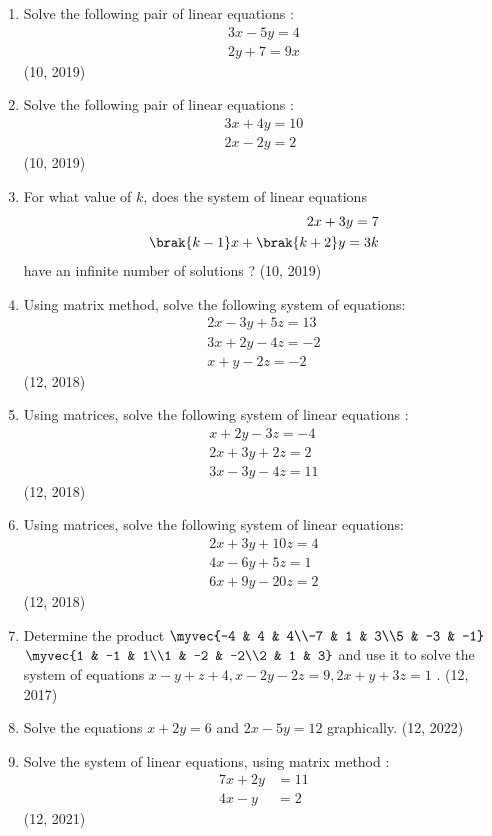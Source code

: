 \begin{enumerate}[label=\thesubsection.\arabic*,ref=\thesubsection.\theenumi]
\item Solve the following pair of linear equations :
\begin{align*}
 3x - 5y = 4\\
2y + 7 = 9x   
\end{align*}    
\hfill (10, 2019)

\item Solve the following pair of linear equations :
\begin{align*}
 3x + 4y = 10\\
2x - 2y = 2   
\end{align*}    
\hfill (10, 2019)
\item For what value of $k$, does the system of linear equations
\begin{align*}
   2x + 3y = 7\\
 \brak{k - 1} x + \brak{k + 2} y = 3k
\end{align*}
have an infinite number of solutions ?
\hfill (10, 2019)
\item Using matrix method, solve the following system of equations: \begin{align*}
  2{x}-3{y}+5{z}=13 \\  3{x}+2{y}-4{z}=-2 \\
  {x}+{y}-2{z}=-2
 \end{align*}
\hfill (12, 2018)
\item Using matrices, solve the following system of linear equations :
	\begin{align*}
		x+2y-3z=-4\\
		2x+3y+2z=2\\
		3x-3y-4z=11
	\end{align*}
\hfill (12, 2018)
\item Using matrices, solve the following system of linear equations:
 \begin{align*}
  2x+3y+10z=4\\
  4x-6y+5z=1\\
  6x+9y-20z=2
 \end{align*}
\hfill (12, 2018)
\item Determine the product	$\myvec{-4 & 4 & 4\\-7 & 1 & 3\\5 & -3 & -1}$ $\myvec{1 & -1 &  1\\1 & -2 & -2\\2 &  1 &  3}$ and use it to solve the system of equations $x-y+z+4, x-2y-2z=9, 2x+y+3z=1$ .
\hfill (12, 2017)
\item Solve the equations $x+2y=6$ and $2x-5y=12$ graphically. \hfill (12, 2022)
\item Solve the system of linear equations, using matrix method : 
\begin{align*}
  7x + 2y &= 11\\
  4x - y &= 2
\end{align*}
\hfill (12, 2021)

\end{enumerate}
